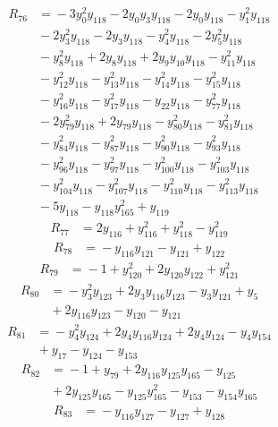 \begin{align*}
R_{76} &={} -3y_{0}^{2}y_{118} -2y_{0}y_{3}y_{118} -2y_{0}y_{118} -y_{1}^{2}y_{118} \\
 &{} -2y_{3}^{2}y_{118} -2y_{3}y_{118} -y_{4}^{2}y_{118} -2y_{5}^{2}y_{118} \\
 &{} -y_{8}^{2}y_{118} +2y_{8}y_{118} +2y_{9}y_{10}y_{118} -y_{11}^{2}y_{118} \\
 &{} -y_{12}^{2}y_{118} -y_{13}^{2}y_{118} -y_{14}^{2}y_{118} -y_{15}^{2}y_{118} \\
 &{} -y_{16}^{2}y_{118} -y_{17}^{2}y_{118} -y_{22}y_{118} -y_{77}^{2}y_{118} \\
 &{} -2y_{79}^{2}y_{118} +2y_{79}y_{118} -y_{80}^{2}y_{118} -y_{81}^{2}y_{118} \\
 &{} -y_{84}^{2}y_{118} -y_{87}^{2}y_{118} -y_{90}^{2}y_{118} -y_{93}^{2}y_{118} \\
 &{} -y_{96}^{2}y_{118} -y_{97}^{2}y_{118} -y_{100}^{2}y_{118} -y_{103}^{2}y_{118} \\
 &{} -y_{104}^{2}y_{118} -y_{107}^{2}y_{118} -y_{110}^{2}y_{118} -y_{113}^{2}y_{118} \\
 &{} -5y_{118} -y_{118}y_{165}^{2} +y_{119}
\end{align*}
\begin{align*}
R_{77} &={} 2y_{116} +y_{116}^{2} +y_{118}^{2} -y_{119}^{2}
\end{align*}
\begin{align*}
R_{78} &={} -y_{116}y_{121} -y_{121} +y_{122}
\end{align*}
\begin{align*}
R_{79} &={} -1 +y_{120}^{2} +2y_{120}y_{122} +y_{121}^{2}
\end{align*}
\begin{align*}
R_{80} &={} -y_{3}^{2}y_{123} +2y_{3}y_{116}y_{123} -y_{3}y_{121} +y_{5} \\
 &{} +2y_{116}y_{123} -y_{120} -y_{121}
\end{align*}
\begin{align*}
R_{81} &={} -y_{4}^{2}y_{124} +2y_{4}y_{116}y_{124} +2y_{4}y_{124} -y_{4}y_{154} \\
 &{} +y_{17} -y_{124} -y_{153}
\end{align*}
\begin{align*}
R_{82} &={} -1 +y_{79} +2y_{116}y_{125}y_{165} -y_{125} \\
 &{} +2y_{125}y_{165} -y_{125}y_{165}^{2} -y_{153} -y_{154}y_{165}
\end{align*}
\begin{align*}
R_{83} &={} -y_{116}y_{127} -y_{127} +y_{128}
\end{align*}
